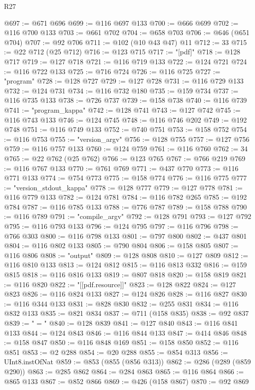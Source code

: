 \begin{lexlean}{R27}
\begin{coremodule}
@697 := @671 @696
@699 := @116 @697 @133
@700 := @666 @699
@702 := @116 @700 @133
@703 := @661 @702
@704 := @658 @703
@706 := @646 (@651 @704)
@707 := @92 @706
@711 := @102 (@10 @43 @47) @11
@712 := 33
@715 := @22 @712 (@25 @712)
@716 := @123 @715
@717 := "[pdf]"
@718 := @128 @717
@719 := @127 @718
@721 := @116 @719 @133
@722 := @124 @721
@724 := @116 @722 @133
@725 := @716 @724
@726 := @116 @725
@727 := "program"
@728 := @128 @727
@729 := @127 @728
@731 := @116 @729 @133
@732 := @124 @731
@734 := @116 @732 @180
@735 := @159 @734
@737 := @116 @735 @133
@738 := @726 @737
@739 := @158 @738
@740 := @116 @739
@741 := "program_kappa"
@742 := @128 @741
@743 := @127 @742
@745 := @116 @743 @133
@746 := @124 @745
@748 := @116 @746 @202
@749 := @192 @748
@751 := @116 @749 @133
@752 := @740 @751
@753 := @158 @752
@754 := @116 @753
@755 := "version_argv"
@756 := @128 @755
@757 := @127 @756
@759 := @116 @757 @133
@760 := @124 @759
@761 := @116 @760
@762 := 34
@765 := @22 @762 (@25 @762)
@766 := @123 @765
@767 := @766 @219
@769 := @116 @767 @133
@770 := @761 @769
@771 := @437 @770
@773 := @116 @771 @133
@774 := @754 @773
@775 := @158 @774
@776 := @116 @775
@777 := "version_stdout_kappa"
@778 := @128 @777
@779 := @127 @778
@781 := @116 @779 @133
@782 := @124 @781
@784 := @116 @782 @265
@785 := @192 @784
@787 := @116 @785 @133
@788 := @776 @787
@789 := @158 @788
@790 := @116 @789
@791 := "compile_argv"
@792 := @128 @791
@793 := @127 @792
@795 := @116 @793 @133
@796 := @124 @795
@797 := @116 @796
@798 := @766 @303
@800 := @116 @798 @133
@801 := @797 @800
@802 := @437 @801
@804 := @116 @802 @133
@805 := @790 @804
@806 := @158 @805
@807 := @116 @806
@808 := "output"
@809 := @128 @808
@810 := @127 @809
@812 := @116 @810 @133
@813 := @124 @812
@815 := @116 @813 @332
@816 := @159 @815
@818 := @116 @816 @133
@819 := @807 @818
@820 := @158 @819
@821 := @116 @820
@822 := "[[pdf.resource]]"
@823 := @128 @822
@824 := @127 @823
@826 := @116 @824 @133
@827 := @124 @826
@828 := @116 @827
@830 := @116 @344 @133
@831 := @828 @830
@832 := @255 @831
@834 := @116 @832 @133
@835 := @821 @834
@837 := @711 (@158 @835)
@838 := @92 @837
@839 := " = "
@840 := @128 @839
@841 := @127 @840
@843 := @116 @841 @133
@844 := @124 @843
@846 := @116 @844 @133
@847 := @414 @846
@848 := @158 @847
@850 := @116 @848 @169
@851 := @158 @850
@852 := @116 @851
@853 := @2 @288
@854 := @20 @288
@855 := @854 @313
@856 := UInt8.instOfNat
@859 := @853 (@855 (@856 @313))
@862 := @286 (@289 (@859 @290))
@863 := @285 @862
@864 := @284 @863
@865 := @116 @864
@866 := @865 @133
@867 := @852 @866
@869 := @426 (@158 @867)
@870 := @92 @869

\end{coremodule}
\end{lexlean}
